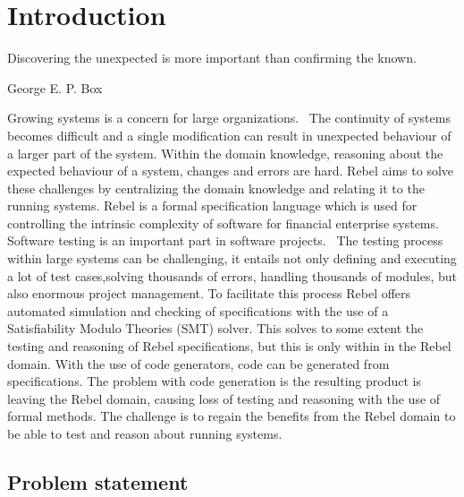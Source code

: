 \chapter{Introduction}

\epigraph{Discovering the unexpected is more important than confirming the
known.}{George E. P. Box}

Growing systems is a concern for large
organizations.~\cite[p.1]{stoel_storm_vinju_bosman_2016} The continuity of
systems becomes difficult and a single modification can result in unexpected
behaviour of a larger part of the system. Within the domain knowledge, reasoning
about the expected behaviour of a system, changes and errors are hard. Rebel
aims to solve these challenges by centralizing the domain knowledge and relating
it to the running systems. Rebel is a formal specification language which is
used for controlling the intrinsic complexity of software for financial
enterprise systems.~\cite[p.1]{stoel_storm_vinju_bosman_2016} Software testing
is an important part in software projects.~\cite[p.4]{myers2011art} The testing
process within large systems can be challenging, it entails not only defining
and executing a lot of test cases,solving thousands of errors, handling
thousands of modules, but also enormous project management. To facilitate this
process Rebel offers automated simulation and checking of specifications with
the use of a Satisfiability Modulo Theories (SMT) solver. This solves to some
extent the testing and reasoning of Rebel specifications, but this is only
within in the Rebel domain. With the use of code generators, code can be
generated from specifications. The problem with code generation is the resulting
product is leaving the Rebel domain, causing loss of testing and reasoning with
the use of formal methods. The challenge is to regain the benefits from the
Rebel domain to be able to test and reason about running systems.

\section{Problem statement}\label{sec:problem-statement}


